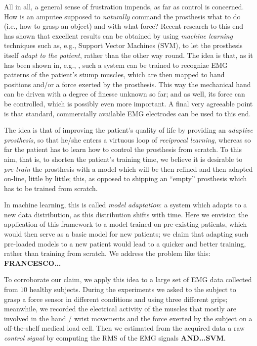All in all, a general sense of frustration impends, as far as control
is concerned. How is an amputee supposed to \emph{naturally} command
the prosthesis what to do (i.e., how to grasp an object) and with what
force? Recent research to this end has shown that excellent results
can be obtained by using \emph{machine learning} techniques such as,
e.g., Support Vector Machines (SVM), to let the prosthesis itself
\emph{adapt to the patient}, rather than the other way round. The idea
is that, as it has been shown in, e.g.,
\cite{smagt,dunlop,2008.ICRA,2008.BioCyb,Sebelius2005}, such a system
can be trained to recognize EMG patterns of the patient's stump
muscles, which are then mapped to hand positions and/or a force
exerted by the prosthesis. This way the mechanical hand can be driven
with a degree of finesse unknown so far; and as well, its force can be
controlled, which is possibly even more important. A final very
agreeable point is that standard, commercially available EMG
electrodes can be used to this end.

The idea is that of improving the patient's quality of life by
providing an \emph{adaptive prosthesis}, so that he/she enters a
virtuous loop of \emph{reciprocal learning}, whereas so far the
patient has to learn how to control the prosthesis from scratch. To
this aim, that is, to shorten the patient's training time, we believe it is
desirable to \emph{pre-train} the prosthesis with a model which will
be then refined and then adapted on-line, little by little; this, as
opposed to shipping an ``empty'' prosthesis which has to be trained
from scratch.

In machine learning, this is called \emph{model adaptation}: a system
which adapts to a new data distribution, as this distribution shifts
with time. Here we envision the application of this framework to a
model trained on pre-existing patients, which would then serve as a
basic model for new patients; we claim that adapting such pre-loaded
models to a new patient would lead to a quicker and better training,
rather than training from scratch. We address the problem like this:
\textbf{FRANCESCO...}

To corroborate our claim, we apply this idea to a large set of EMG
data collected from $10$ healthy subjects. During the experiments 
we asked to the subject to grasp a force sensor in different 
conditions and using three different grips; meanwhile, we  
recorded the electrical activity of the muscles that mostly are
involved in the hand / wrist movements and the force exerted by 
the subject on a off-the-shelf medical load cell. Then we estimated
from the acquired data a raw \emph{control signal} by computing the
RMS of the EMG signals \textbf{AND...SVM}.

